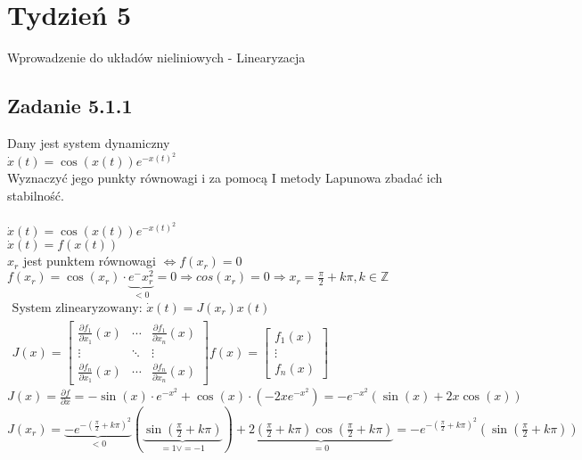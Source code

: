 \pagebreak
\section*{Tydzień 5}
Wprowadzenie do układów nieliniowych - Linearyzacja
\subsection*{Zadanie 5.1.1} {\color{darkgray}
	Dany jest system dynamiczny\\
	$\dot{x}(t)= \cos(x(t))e^{-x(t)^2}$\\
	Wyznaczyć jego punkty równowagi i za pomocą I metody Lapunowa zbadać ich stabilność.
}\\\\
$\dot{x}(t)=\cos(x(t))e^{-x(t)^2}$\\
$\dot{x}(t)=f(x(t))$\\
$x_r$ jest punktem równowagi $ \Leftrightarrow f(x_r)=0$\\
$f(x_r)=\cos(x_r)\cdot \underbrace{e^-x_r^2}_{<0}=0 \Rightarrow cos(x_r)=0 \Rightarrow x_r=\frac{\pi}{2}+k\pi, k \in \mathbb{Z}$\\
$\boxed{\begin{aligned}
\text{System zlinearyzowany: } \dot{x}(t)=J(x_r)x(t)\\
J(x)=\left[ \begin{array}{ccc} 
 \frac{\partial f_1}{\partial x_1}(x) & \cdots &  \frac{\partial f_1}{\partial x_n}(x)\\
\vdots & \ddots & \vdots\\
\frac{\partial f_n}{\partial x_1}(x) &\cdots & \frac{\partial f_n}{\partial x_n}(x) 
  \end{array}\right] f(x)= \left[ \begin{array}{c}  f_1(x)   \\ \vdots \\ f_n(x)    \end{array}\right]
\end{aligned}}$\\
$J(x)=\frac{\partial f}{\partial x} = - \sin(x) \cdot e^{-x^2}+\cos(x) \cdot (-2xe^{-x^2})=-e^{-x^2}(\sin(x)+2x\cos(x))$\\
$J(x_r)=\underbrace{-e^{-(\frac{\pi}{2}+k\pi)^2}}_{<0}(\underbrace{\sin(\frac{\pi}{2}+k\pi)}_{=1 \vee =-1})+\underbrace{2(\frac{\pi}{2}+k\pi)\cos(\frac{\pi}{2}+k\pi)}_{=0}=-e^{-(\frac{\pi}{2}+k\pi)^2} (\sin(\frac{\pi}{2}+k\pi))$\\
